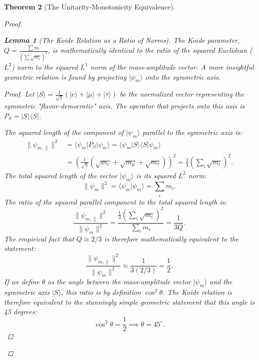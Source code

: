 \documentclass[11pt, letterpaper]{report}
\theoremstyle{plain} %
\newtheorem{theorem}{Theorem}[chapter]
\newtheorem{lemma}[theorem]{Lemma}
\theoremstyle{definition} %
\theoremstyle{remark} %
\begin{document}
\begin{theorem}[The Unitarity-Monotonicity Equivalence]
\begin{proof}
\begin{lemma}[The Koide Relation as a Ratio of Norms]
The Koide parameter, $Q = \frac{\sum m_i}{(\sum \sqrt{m_i})^2}$, is mathematically identical to the ratio of the squared Euclidean ($L^2$) norm to the squared $L^1$ norm of the mass-amplitude vector. A more insightful geometric relation is found by projecting $|\psi_m\rangle$ onto the symmetric axis.
\end{lemma}
\begin{proof}
Let $|S\rangle = \frac{1}{\sqrt{3}}(|e\rangle + |\mu\rangle + |\tau\rangle)$ be the normalized vector representing the symmetric "flavor-democratic" axis. The operator that projects onto this axis is $P_S = |S\rangle\langle S|$.

The squared length of the component of $|\psi_m\rangle$ parallel to the symmetric axis is:
\begin{align}
    \|\psi_{m, \parallel}\|^2 &= \langle\psi_m|P_S|\psi_m\rangle = \langle\psi_m|S\rangle\langle S|\psi_m\rangle \\
    &= \left( \frac{1}{\sqrt{3}}(\sqrt{m_e}+\sqrt{m_\mu}+\sqrt{m_\tau}) \right)^2 = \frac{1}{3}\left(\sum_i \sqrt{m_i}\right)^2.
\end{align}
The total squared length of the vector $|\psi_m\rangle$ is its squared $L^2$ norm:
\begin{equation}
    \|\psi_m\|^2 = \langle\psi_m|\psi_m\rangle = \sum_i m_i.
\end{equation}
The ratio of the squared parallel component to the total squared length is:
\begin{equation}
    \frac{\|\psi_{m, \parallel}\|^2}{\|\psi_m\|^2} = \frac{\frac{1}{3}\left(\sum_i \sqrt{m_i}\right)^2}{\sum_i m_i} = \frac{1}{3Q}.
\end{equation}
The empirical fact that $Q \approx 2/3$ is therefore mathematically equivalent to the statement:
\begin{equation}
    \frac{\|\psi_{m, \parallel}\|^2}{\|\psi_m\|^2} \approx \frac{1}{3(2/3)} = \frac{1}{2}.
\end{equation}
If we define $\theta$ as the angle between the mass-amplitude vector $|\psi_m\rangle$ and the symmetric axis $|S\rangle$, this ratio is by definition $\cos^2\theta$. The Koide relation is therefore equivalent to the stunningly simple geometric statement that this angle is 45 degrees:
\begin{equation}
    \cos^2\theta = \frac{1}{2} \implies \theta = 45^\circ.
    \label{eq:koide_angle}
\end{equation}
\end{proof}


\end{proof}
\end{theorem}
\end{document}
